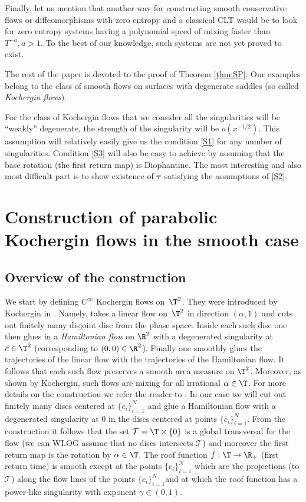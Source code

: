 \documentclass[10pt]{amsart}
\newcommand\cT{\mathcal{T}}
\newcommand\btau{{\boldsymbol{\tau}}}
\theoremstyle{definition}
\theoremstyle{plain}
\begin{document}
{Finally, let us mention that another way for constructing smooth conservative flows or diffeomorphisms with zero entropy and a classical CLT would be to look for zero entropy systems having a polynomial speed of mixing faster than $T^{-a}, a>1$. To the best of our knowledge, such systems are not yet proved to exist.}

The rest of the paper is devoted to the proof of Theorem \ref{thm:SP}. Our examples
belong to the class of smooth flows on surfaces with degenerate saddles (so called \emph{Kochergin flows}).

For the class of Kochergin flows that we consider all the singularities will be ``weakly'' degenerate, \ie the strength of the singularity will be $o(x^{-1/2})$. This assumption will relatively easily give us the condition \eqref{S1} for any number of singularities. Condition \eqref{S3} will also be easy to achieve by assuming that the base rotation (the first return map) is Diophantine. The most interesting and also most difficult part is to show existence of $\btau$ satisfying the assumptions of \eqref{S2}.

\section{Construction of parabolic Kochergin flows in the smooth case} \label{sec.koc}

\subsection{Overview of the construction}
\label{SSOverview}

We start by defining $C^\infty$ Kochergin flows on~$\T^2$. They were introduced by Kochergin in \cite{Koch}.
{ Namely,}
\cite{Koch} takes a linear flow on~$\T^2$ in direction $(\alpha,1)$ and cuts out finitely many disjoint disc from the phase space. Inside each such disc one then glues in a \emph{Hamiltonian flow} on $\R^2$ with a degenerated singularity at $\bar{c}\in \T^2$ (corresponding to $(0,0)\in \R^2$). Finally one smoothly glues the trajectories of the linear flow with the trajectories of the Hamiltonian flow. It follows that each such flow preserves a smooth area measure on $\T^2$. Moreover, as shown by Kochergin, such flows are mixing for all irrational $\alpha\in \T$. For more details on the construction we refer the reader to \cite{Koch}. In our case we will cut out finitely many discs centered at
$\{\bar{c}_i\}_{i=1}^N$ and glue a Hamiltonian flow with a degenerated singularity at $0$ in the discs centered at points $\{\bar{c}_i\}_{i=1}^N$. From the construction it follows that the set $\cT=\T\times\{0\}$ is a global transversal for the flow (we can WLOG assume that no discs intersects $\cT$) and moreover the first return map is the rotation by $\alpha\in \T$. The roof function $f:\T\to \R_+$ (first return time) is smooth except at { the points $\{c_i\}_{i=1}^N$ which are the projections (to $\cT$) along the flow lines of the points $\{\bar{c}_i\}_{i=1}^N$}and at which the roof function has a power-like singularity with exponent $\gamma \in (0,1)$.
\end{document}
